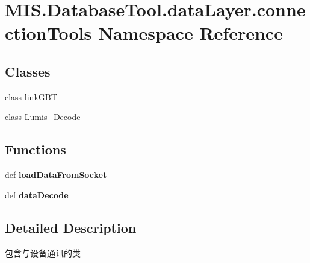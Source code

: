 \hypertarget{namespaceMIS_1_1DatabaseTool_1_1dataLayer_1_1connectionTools}{}\section{M\+I\+S.\+Database\+Tool.\+data\+Layer.\+connection\+Tools Namespace Reference}
\label{namespaceMIS_1_1DatabaseTool_1_1dataLayer_1_1connectionTools}
\subsection*{Classes}
\begin{DoxyCompactItemize}
\item 
class \hyperlink{classMIS_1_1DatabaseTool_1_1dataLayer_1_1connectionTools_1_1linkGBT}{link\+G\+BT}
\item 
class \hyperlink{classMIS_1_1DatabaseTool_1_1dataLayer_1_1connectionTools_1_1Lumis__Decode}{Lumis\+\_\+\+Decode}
\end{DoxyCompactItemize}
\subsection*{Functions}
\begin{DoxyCompactItemize}
\item 
\mbox{\label{namespaceMIS_1_1DatabaseTool_1_1dataLayer_1_1connectionTools_af7d01dfccdfd4267d66716bd23619871}} 
def {\bfseries load\+Data\+From\+Socket}
\item 
\mbox{\label{namespaceMIS_1_1DatabaseTool_1_1dataLayer_1_1connectionTools_ac64b9b58e4a2b5edbd5e5330ece10fb3}} 
def {\bfseries data\+Decode}
\end{DoxyCompactItemize}


\subsection{Detailed Description}
\begin{DoxyVerb}包含与设备通讯的类
\end{DoxyVerb}
 
